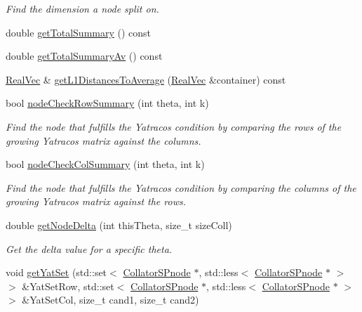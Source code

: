 \begin{DoxyCompactItemize}
\begin{DoxyCompactList}\small\item\em \-Find the dimension a node split on. \end{DoxyCompactList}\item 
double \hyperlink{classsubpavings_1_1CollatorSPnode_a77e75118f31767497377790cd87e3869}{get\-Total\-Summary} () const 
\item 
double \hyperlink{classsubpavings_1_1CollatorSPnode_a8c48fd024a9e569830168a3f301d798e}{get\-Total\-Summary\-Av} () const 
\item 
\hyperlink{namespacesubpavings_af2d57bb6e12f4a73169f2e496d6a641f}{\-Real\-Vec} \& \hyperlink{classsubpavings_1_1CollatorSPnode_a944e27bc584e24e630411e787456ffe0}{get\-L1\-Distances\-To\-Average} (\hyperlink{namespacesubpavings_af2d57bb6e12f4a73169f2e496d6a641f}{\-Real\-Vec} \&container) const 
\item 
bool \hyperlink{classsubpavings_1_1CollatorSPnode_af089a7955e0dd12ef33af3ec4bfc6627}{node\-Check\-Row\-Summary} (int theta, int k)
\begin{DoxyCompactList}\small\item\em \-Find the node that fulfills the \-Yatracos condition by comparing the rows of the growing \-Yatracos matrix against the columns. \end{DoxyCompactList}\item 
bool \hyperlink{classsubpavings_1_1CollatorSPnode_aeb5549c6c555a65ee6cf71e779873b67}{node\-Check\-Col\-Summary} (int theta, int k)
\begin{DoxyCompactList}\small\item\em \-Find the node that fulfills the \-Yatracos condition by comparing the columns of the growing \-Yatracos matrix against the rows. \end{DoxyCompactList}\item 
double \hyperlink{classsubpavings_1_1CollatorSPnode_a72b47c222d49deba3753259d94d730c3}{get\-Node\-Delta} (int this\-Theta, size\-\_\-t size\-Coll)
\begin{DoxyCompactList}\small\item\em \-Get the delta value for a specific theta. \end{DoxyCompactList}\item 
void \hyperlink{classsubpavings_1_1CollatorSPnode_aaf5207af98f7fac37ffe63ab3aec15b9}{get\-Yat\-Set} (std\-::set$<$ \hyperlink{classsubpavings_1_1CollatorSPnode}{\-Collator\-S\-Pnode} $\ast$, std\-::less$<$ \hyperlink{classsubpavings_1_1CollatorSPnode}{\-Collator\-S\-Pnode} $\ast$ $>$ $>$ \&\-Yat\-Set\-Row, std\-::set$<$ \hyperlink{classsubpavings_1_1CollatorSPnode}{\-Collator\-S\-Pnode} $\ast$, std\-::less$<$ \hyperlink{classsubpavings_1_1CollatorSPnode}{\-Collator\-S\-Pnode} $\ast$ $>$ $>$ \&\-Yat\-Set\-Col, size\-\_\-t cand1, size\-\_\-t cand2)

\end{DoxyCompactItemize}
